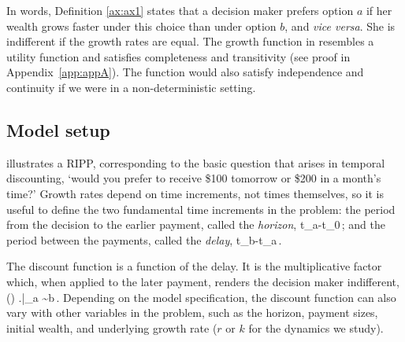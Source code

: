 In words, Definition \ref{ax:ax1} states that a decision maker prefers option $a$ if her wealth grows faster under this choice than under option $b$, and \textit{vice versa}. She is indifferent if the growth rates are equal. The growth function in  resembles a utility function and satisfies completeness and transitivity (see proof in Appendix~\ref{app:appA}). The function would also satisfy independence and continuity if we were in a non-deterministic setting. 

%

\subsection{Model setup}

 illustrates a RIPP, corresponding to the basic question that arises in temporal discounting, \eg `would you prefer to receive \$100 tomorrow or \$200 in a month's time?' Growth rates depend on time increments, not times themselves, so it is useful to define the two fundamental time increments in the problem: the period from the decision to the earlier payment, called the \textit{horizon},
%
\be
\hor \equiv t_a-t_0\,;
\ee
%
and the period between the payments, called the \textit{delay},
%
\be
\del \equiv t_b-t_a\,.
\ee
%

The discount function is a function of the delay. It is the multiplicative factor which, when applied to the later payment, renders the decision maker indifferent, \ie
%
\be
\delta\left(\del\right) \equiv \left.\right|_{a \sim b}\,.
\ee
%
Depending on the model specification, the discount function can also vary with other variables in the problem, such as the horizon, payment sizes, initial wealth, and underlying growth rate ($r$ or $k$ for the dynamics we study).

